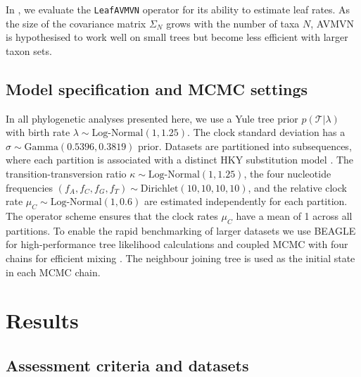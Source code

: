 \documentclass[10pt,letterpaper]{article}
\begin{document}
In , we evaluate the \texttt{LeafAVMVN} operator for its ability to estimate leaf rates. 
As the size of the covariance matrix $\Sigma_N$ grows with the number of taxa $N$, AVMVN is hypothesised to work well on small trees but become less efficient with larger taxon sets.







\clearpage
\subsection*{Model specification and MCMC settings} \label{sect:methods}

In all phylogenetic analyses presented here, we use a Yule \cite{yule1925ii} tree prior $p(\mathcal{T}|\lambda)$ with birth rate $\lambda \sim \text{Log-Normal}(1,1.25)$.
The clock standard deviation has a $\sigma \sim \text{Gamma}(0.5396,0.3819)$ prior.
Datasets are partitioned into subsequences, where each partition is associated with a distinct HKY substitution model \cite{hasegawa1985dating}.
The transition-transversion ratio $\kappa \sim \text{Log-Normal}(1, 1.25)$, the four nucleotide frequencies $(f_A, f_C, f_G, f_T) \sim \text{Dirichlet}(10,10,10,10)$, and the relative clock rate $\mu_C \sim \text{Log-Normal}(1, 0.6)$ are estimated independently for each partition.
The operator scheme ensures that the clock rates $\mu_C$ have a mean of 1 across all partitions. 
To enable the rapid benchmarking of larger datasets we use BEAGLE for high-performance tree likelihood calculations \cite{ayres2012beagle} and coupled MCMC with four chains for efficient mixing \cite{muller2019coupled}.
The neighbour joining tree \cite{saitou1987neighbor} is used as the initial state in each MCMC chain.



\clearpage
\section*{Results} \label{sect:results}





\subsection*{Assessment criteria and datasets}
\end{document}

